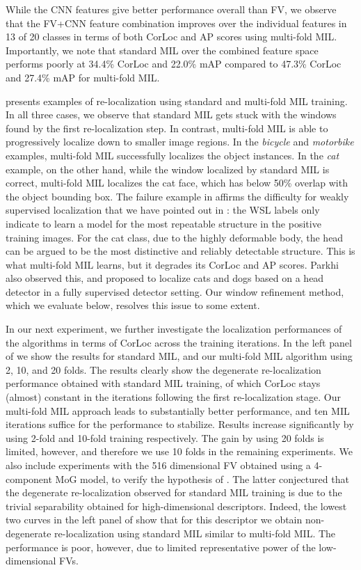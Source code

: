 \documentclass[10pt,journal,cspaper,final,twocolumn,compsoc]{./IEEEtran}
\begin{document}
While the CNN features give better
performance overall than FV, we observe that the FV+CNN feature
combination improves over the individual features in 13
of 20 classes in terms of both CorLoc and AP scores using 
multi-fold MIL. 
Importantly, we note that standard MIL over the combined
feature space performs poorly at 34.4\% CorLoc and 22.0\%
mAP compared to
47.3\% CorLoc and 27.4\% mAP for multi-fold MIL. 

 presents examples of
re-localization using standard and multi-fold MIL
training. In all three cases,
we observe that standard MIL gets stuck with the windows
found by the first re-localization step. In contrast,
multi-fold MIL is able to progressively localize down to
smaller image regions. In the {\em bicycle}
and {\em motorbike} examples, multi-fold MIL
successfully localizes the object instances.  In the {\em
cat} example, on the other hand, while the window
localized by standard MIL is correct, multi-fold MIL
localizes  the cat face, which has below 50\%
overlap with the object bounding box.  
The failure example in  affirms the 
difficulty for weakly supervised localization that we have
pointed out in : the WSL labels only
indicate to learn a model for the most repeatable
structure in the positive training images. For the cat class, due to the highly
deformable body, the head can be argued to  be
the most distinctive and reliably detectable structure.
This is what multi-fold MIL learns, but it degrades its
CorLoc and AP scores. Parkhi \etal~\cite{parkhi11iccv} also observed this, and proposed to localize cats and dogs based on a head detector in a fully supervised detector setting.  
Our window refinement method, which we evaluate below, resolves this issue to some extent.



In our next experiment, we further investigate the
localization performances of the algorithms in terms of
CorLoc across the training iterations. In the left panel
of  we show the results for standard
MIL, and our multi-fold MIL algorithm using 2, 10, and 20
folds. The results clearly show the degenerate
re-localization performance obtained with standard MIL
training, of which CorLoc stays (almost) constant in the
iterations following the first re-localization stage. Our
multi-fold MIL approach leads to substantially better
performance, and ten MIL iterations suffice for the
performance to stabilize. Results increase significantly
by using 2-fold and 10-fold training respectively.  The
gain by using 20 folds is limited, however, and therefore
we use 10 folds in the remaining experiments. 
We also include experiments with the 516 dimensional FV
obtained using a 4-component MoG model, to verify the
hypothesis of .  The latter conjectured
that the degenerate re-localization observed for standard
MIL training is due to the trivial separability obtained
for high-dimensional descriptors.  Indeed, the lowest two
curves in the left panel of  show that for
this descriptor we obtain non-degenerate re-localization
using standard MIL similar to multi-fold MIL.  The
performance is poor, however, due to limited
representative power of the low-dimensional FVs.
\end{document}
